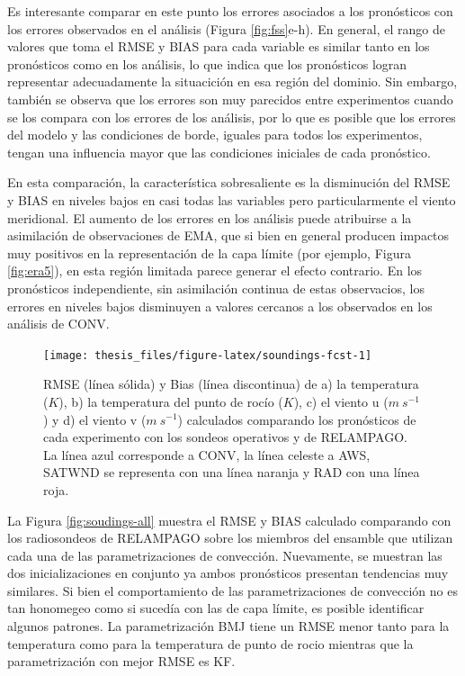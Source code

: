 \documentclass[12pt,oneside]{reedthesis}
\begin{document}
Es interesante comparar en este punto los errores asociados a los pronósticos con los errores observados en el análisis (Figura \ref{fig:fss}e-h). En general, el rango de valores que toma el RMSE y BIAS para cada variable es similar tanto en los pronósticos como en los análisis, lo que indica que los pronósticos logran representar adecuadamente la situacición en esa región del dominio. Sin embargo, también se observa que los errores son muy parecidos entre experimentos cuando se los compara con los errores de los análisis, por lo que es posible que los errores del modelo y las condiciones de borde, iguales para todos los experimentos, tengan una influencia mayor que las condiciones iniciales de cada pronóstico.

En esta comparación, la característica sobresaliente es la disminución del RMSE y BIAS en niveles bajos en casi todas las variables pero particularmente el viento meridional. El aumento de los errores en los análisis puede atribuirse a la asimilación de observaciones de EMA, que si bien en general producen impactos muy positivos en la representación de la capa límite (por ejemplo, Figura \ref{fig:era5}), en esta región limitada parece generar el efecto contrario. En los pronósticos independiente, sin asimilación continua de estas observacios, los errores en niveles bajos disminuyen a valores cercanos a los observados en los análisis de CONV.


\begin{figure}

{\centering \texttt{[image: thesis\_files/figure-latex/soundings-fcst-1]} 

}

\caption{RMSE (línea sólida) y Bias (línea discontinua) de a) la temperatura (\(K\)), b) la temperatura del punto de rocío (\(K\)), c) el viento u (\(m\ s^{-1}\)) y d) el viento v (\(m\ s^{-1}\)) calculados comparando los pronósticos de cada experimento con los sondeos operativos y de RELAMPAGO. La línea azul corresponde a CONV, la línea celeste a AWS, SATWND se representa con una línea naranja y RAD con una línea roja.}\label{fig:soundings-fcst}
\end{figure}
La Figura \ref{fig:soudings-all} muestra el RMSE y BIAS calculado comparando con los radiosondeos de RELAMPAGO sobre los miembros del ensamble que utilizan cada una de las parametrizaciones de convección. Nuevamente, se muestran las dos inicializaciones en conjunto ya ambos pronósticos presentan tendencias muy similares. Si bien el comportamiento de las parametrizaciones de convección no es tan honomegeo como si sucedía con las de capa límite, es posible identificar algunos patrones. La parametrización BMJ tiene un RMSE menor tanto para la temperatura como para la temperatura de punto de rocio mientras que la parametrización con mejor RMSE es KF.
\end{document}
